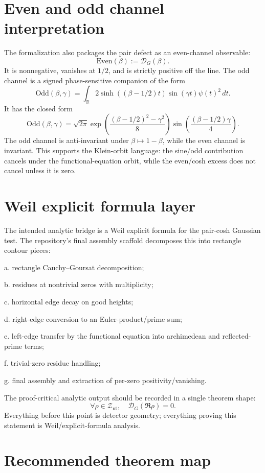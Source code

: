 \documentclass[11pt]{article}
\newcommand{\R}{\mathbb R}
\newcommand{\NTZ}{\mathcal Z_{\mathrm{nt}}}
\newcommand{\gpdef}{\mathcal D_G}
\begin{document}
\section{Even and odd channel interpretation}

The formalization also packages the pair defect as an even-channel observable:
\[
  \mathrm{Even}(\beta):=\gpdef(\beta).
\]
It is nonnegative, vanishes at \(1/2\), and is strictly positive off the line.
The odd channel is a signed phase-sensitive companion of the form
\[
  \mathrm{Odd}(\beta,\gamma)
  =\int_{\R}2\sinh((\beta-1/2)t)\sin(\gamma t)\psi(t)^2\,dt.
\]
It has the closed form
\[
  \mathrm{Odd}(\beta,\gamma)
  =\sqrt{2\pi}\exp\left(\frac{(\beta-1/2)^2-\gamma^2}{8}\right)
    \sin\left(\frac{(\beta-1/2)\gamma}{4}\right).
\]
The odd channel is anti-invariant under \(\beta\mapsto1-\beta\), while the even channel
is invariant.  This supports the Klein-orbit language: the sine/odd contribution cancels
under the functional-equation orbit, while the even/cosh excess does not cancel unless it
is zero.

\section{Weil explicit formula layer}

The intended analytic bridge is a Weil explicit formula for the pair-cosh Gaussian test.
The repository's final assembly scaffold decomposes this into rectangle contour pieces:

a. rectangle Cauchy--Goursat decomposition;

b. residues at nontrivial zeros with multiplicity;

c. horizontal edge decay on good heights;

d. right-edge conversion to an Euler-product/prime sum;

e. left-edge transfer by the functional equation into archimedean and reflected-prime
terms;

f. trivial-zero residue handling;

g. final assembly and extraction of per-zero positivity/vanishing.

The proof-critical analytic output should be recorded in a single theorem shape:
\[
  \forall \rho\in\NTZ,\quad \gpdef(\Re\rho)=0.
\]
Everything before this point is detector geometry; everything proving this statement is
Weil/explicit-formula analysis.

\section{Recommended theorem map}
\end{document}
